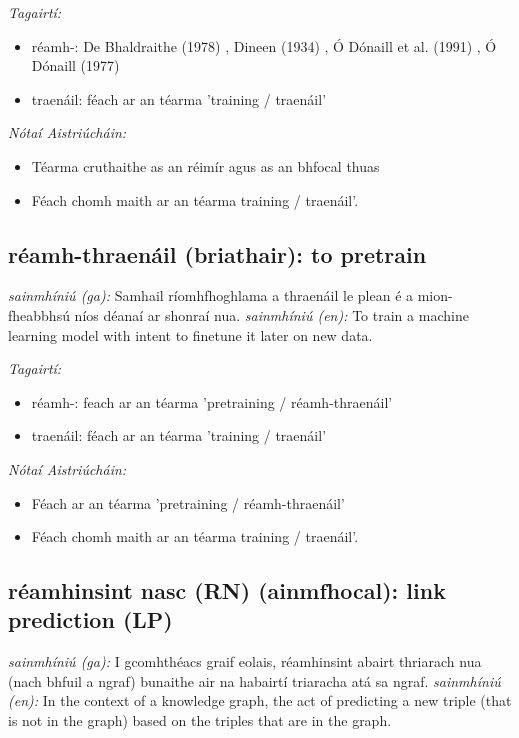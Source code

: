 \documentclass{article}
\begin{document}
 \noindent \textit{Tagairtí:}
\begin{itemize}
	\item réamh-: De Bhaldraithe (1978) \cite{de-bhaldraithe}, Dineen (1934) \cite{dineen}, Ó Dónaill et al. (1991) \cite{focloir-beag}, Ó Dónaill (1977) \cite{odonaill}
	\item traenáil: féach ar an téarma 'training / traenáil'
\end{itemize}

 \noindent \textit{Nótaí Aistriúcháin:}
\begin{itemize}
	\item Téarma cruthaithe as an réimír agus as an bhfocal thuas
	\item Féach chomh maith ar an téarma training / traenáil'.
\end{itemize}


\subsection*{réamh-thraenáil (briathair): to pretrain} 
 \noindent \textit{sainmhíniú (ga):} Samhail ríomhfhoghlama a thraenáil le plean é a mion-fheabbhsú níos déanaí ar shonraí nua.
\newline\newline
 \noindent \textit{sainmhíniú (en):} To train a machine learning model with intent to finetune it later on new data.
\newline

 \noindent \textit{Tagairtí:}
\begin{itemize}
	\item réamh-: feach ar an téarma 'pretraining / réamh-thraenáil'
	\item traenáil: féach ar an téarma 'training / traenáil'
\end{itemize}

 \noindent \textit{Nótaí Aistriúcháin:}
\begin{itemize}
	\item Féach ar an téarma 'pretraining / réamh-thraenáil'
	\item Féach chomh maith ar an téarma training / traenáil'.
\end{itemize}


\subsection*{réamhinsint nasc (RN) (ainmfhocal): link prediction (LP)} 
 \noindent \textit{sainmhíniú (ga):} I gcomhthéacs graif eolais, réamhinsint abairt thriarach nua (nach bhfuil a ngraf) bunaithe air na habairtí triaracha atá sa ngraf.
\newline\newline
 \noindent \textit{sainmhíniú (en):} In the context of a knowledge graph, the act of predicting a new triple (that is not in the graph) based on the triples that are in the graph.
\newline
\end{document}
